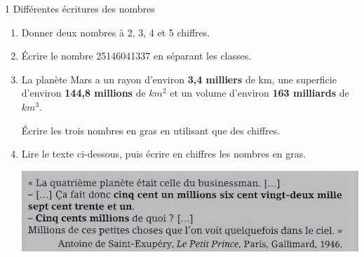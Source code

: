 \begin{myact}{1 Différentes écritures des nombres}

	\label{act:nbres}
	
	\begin{enumerate}
		\item Donner deux nombres à 2, 3, 4 et 5 chiffres.
		
		\item \'Ecrire  le nombre 25146041337 en séparant les classes.
		\item La planète Mars a un rayon d'environ \textbf{3,4 milliers} de km, une superficie d'environ \textbf{144,8 millions} de $km^2$ et un volume d'environ \textbf{163 milliards} de $km^3$.
		
		\'Ecrire les trois nombres en gras en utilisant que des chiffres.
		
		\item Lire le texte ci-dessous, puis écrire en chiffres les nombres en gras.
		
			\begin{center}
				\includegraphics[scale=1.1]{img/act1}
			\end{center}
	\end{enumerate}
\end{myact}

